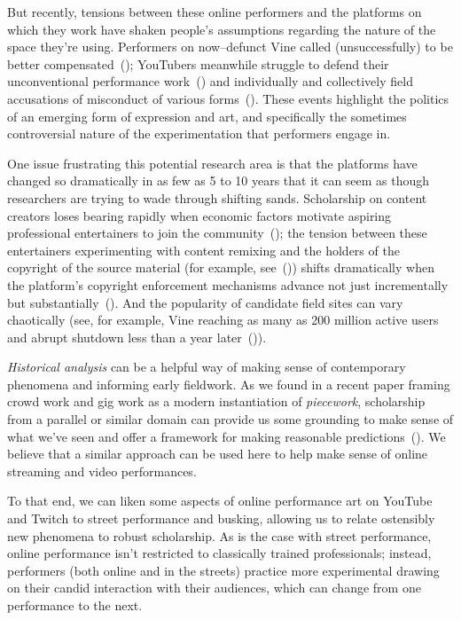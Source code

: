 \documentclass[10pt]{article}
\begin{document}
But recently, tensions between these online performers and the platforms on which they work have shaken people's
assumptions regarding the nature of the space they're using.
Performers on now--defunct Vine called (unsuccessfully) to be better compensated~(\cite{vineWantsMoney,vineInsiderMeeting});
YouTubers meanwhile struggle to defend their unconventional performance work~(\cite{h3h3Lawsuit})
and individually and collectively field accusations of misconduct of various forms~(\cite{youtubeDramaResponses}).
These events highlight the politics of an emerging form of expression and art,
and specifically the sometimes controversial nature of the experimentation that performers engage in.

One issue frustrating this potential research area is that
the platforms have changed so dramatically in as few as 5 to 10 years that
it can seem as though researchers are trying to wade through shifting sands.
Scholarship on content creators loses bearing rapidly when
economic factors motivate aspiring professional entertainers to join the community~(\cite{Hamilton:2014:STF:2611105.2557048});
the tension between these entertainers experimenting with content remixing and
the holders of the copyright of the source material
(for example, see~(\cite{Hilderbrand48}))
shifts dramatically when
the platform's copyright enforcement mechanisms advance
not just incrementally but substantially~(\cite{kim2012institutionalization}).
And the popularity of candidate field sites can vary chaotically
(see, for example, Vine reaching as many as 200 million active users and
abrupt shutdown less than a year later~(\cite{vineDecline})).

\textit{Historical analysis}
can be a helpful way of
making sense of contemporary phenomena and informing early fieldwork.
As we found in a recent paper framing crowd work and gig work as a modern instantiation of \textit{piecework},
scholarship from a parallel or similar domain can
provide us some grounding to make sense of what we've seen and offer a framework for making reasonable predictions~(\cite{pieceworkCrowdworkGigwork}).
We believe that a similar approach can be used here to help make sense of online streaming and video performances.

To that end, we can liken some aspects of online performance art on YouTube and Twitch
to street performance and busking,
allowing us to relate ostensibly new phenomena to robust scholarship.
As is the case with street performance,
online performance isn't restricted to classically trained professionals;
instead, performers (both online and in the streets) practice more experimental 
drawing on their candid interaction with their audiences,
which can change from one performance to the next.
\end{document}
